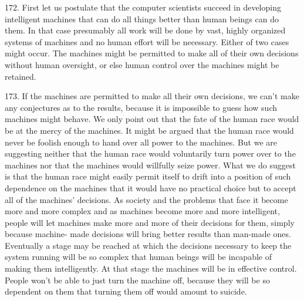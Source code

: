 \documentclass{article}
\begin{document}
172. First let us postulate that the computer scientists succeed in developing intelligent machines 
that can do all things better than human beings can do them. In that case presumably all work will 
be done by vast, highly organized systems of machines and no human effort will be 
necessary. Either of two cases might occur. The machines might be permitted to make all of their 
own decisions without human oversight, or else human control over the machines might be 
retained. \vspace{\baselineskip}

173. If the machines are permitted to make all their own decisions, we can’t make any conjectures 
as to the results, because it is impossible to guess how such machines might behave. We only 
point out that the fate of the human race would be at the mercy of the machines. It might be argued 
that the human race would never be foolish enough to hand over all power to the machines. But 
we are suggesting neither that the human race would voluntarily turn power over to the machines 
nor that the machines would willfully seize power. What we do suggest is that the human race 
might easily permit itself to drift into a position of such dependence on the machines that it would 
have no practical choice but to accept all of the machines’ decisions. As society and the problems 
that face it become more and more complex and as machines become more and more intelligent, 
people will let machines make more and more of their decisions for them, simply because machine-
made decisions will bring better results than man-made ones. Eventually a stage may be reached 
at which the decisions necessary to keep the system running will be so complex that human beings 
will be incapable of making them intelligently. At that stage the machines will be in effective 
control. People won’t be able to just turn the machine off, because they will be so dependent on 
them that turning them off would amount to suicide. \vspace{\baselineskip}
\end{document}
